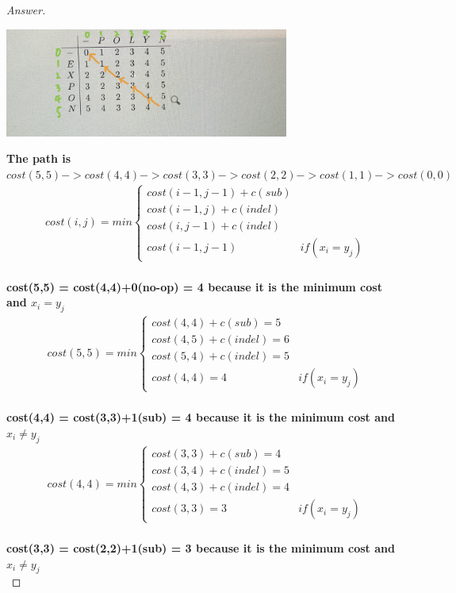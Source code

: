 \documentclass[11pt]{article}
\theoremstyle{definition}
\theoremstyle{definition}
\theoremstyle{definition}
\begin{document}
\begin{proof}[Answer]
\begin{center}
\includegraphics[width=0.7\textwidth]{IMG_0510.PNG}
\end{center}
\textbf{The path is $cost(5,5) -> cost(4,4) -> cost(3,3) -> cost(2,2) -> cost(1,1) -> cost(0,0) $}\\
\begin{align*}
cost(i,j) = min\begin{cases}
cost(i-1,j-1) + c(sub) \\
cost(i-1,j) + c(indel) \\
cost(i,j-1) + c(indel)\\
cost(i-1,j-1) & if (x_i = y_j)
\end{cases}
\end{align*}
\\\textbf{cost(5,5) = cost(4,4)+0(no-op) = 4 because it is the minimum cost and $x_i = y_j$}\\
\begin{align*}
cost(5,5) = min\begin{cases}
cost(4,4) + c(sub) = 5 \\
cost(4,5) + c(indel) = 6\\
cost(5,4) + c(indel) = 5\\
cost(4,4) = 4 & if (x_i = y_j)
\end{cases}
\end{align*}
\\\textbf{cost(4,4) = cost(3,3)+1(sub) = 4 because it is the minimum cost and $x_i \neq  y_j$}\\
\begin{align*}
cost(4,4) = min\begin{cases}
cost(3,3) + c(sub) = 4 \\
cost(3,4) + c(indel) = 5\\
cost(4,3) + c(indel) = 4\\
cost(3,3) = 3 & if (x_i = y_j)
\end{cases}
\end{align*}
\\\textbf{cost(3,3) = cost(2,2)+1(sub) = 3 because it is the minimum cost and $x_i \neq y_j$}\\

\end{proof}
\end{document}
